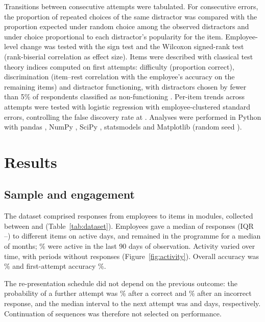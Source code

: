 Transitions between consecutive attempts were tabulated. For consecutive errors, the proportion of
repeated choices of the same distractor was compared with the proportion expected under random
choice among the observed distractors and under choice proportional to each distractor's popularity
for the item. Employee-level change was tested with the sign test and the Wilcoxon signed-rank test
(rank-biserial correlation as effect size). Items were described with classical test theory indices
computed on first attempts: difficulty (proportion correct), discrimination (item--rest correlation
with the employee's accuracy on the remaining items) and distractor functioning, with distractors
chosen by fewer than 5\% of respondents classified as non-functioning \citep{tarrant2009,gierl2017}.
Per-item trends across attempts were tested with logistic regression with employee-clustered
standard errors, controlling the false discovery rate at \Alpha{} \citep{benjamini1995}.
Analyses were performed in Python \VerPython{} with pandas \VerPandas, NumPy \VerNumpy,
SciPy \VerScipy, statsmodels \VerStatsmodels{} and Matplotlib \VerMatplotlib{} (random seed \Seed).

\section{Results}

\subsection{Sample and engagement}
The dataset comprised \NResponses{} responses from \NEmployees{} employees to \NItems{} items in
\NModules{} modules, collected between \DateStart{} and \DateEnd{} (Table~\ref{tab:dataset}).
Employees gave a median of \RespPerEmpMedian{} responses (IQR \RespPerEmpQOne--\RespPerEmpQThree)
to \ItemsPerEmpMedian{} different items on \ActiveDaysMedian{} active days, and remained in the
programme for a median of \SpanMonthsMedian{} months; \ActiveLastQuarterPct\% were active in the
last 90 days of observation. Activity varied over time, with periods without responses
(Figure~\ref{fig:activity}). 
Overall accuracy was \AccOverall\% and first-attempt accuracy \AccFirst\%.

The re-presentation schedule did not depend on the previous outcome: the probability of a further
attempt was \ReaskAfterCorrect\% after a correct and \ReaskAfterIncorrect\% after an incorrect
response, and the median interval to the next attempt was \GapAfterCorrect{} and
\GapAfterIncorrect{} days, respectively. Continuation of sequences was therefore not selected on
performance. %

